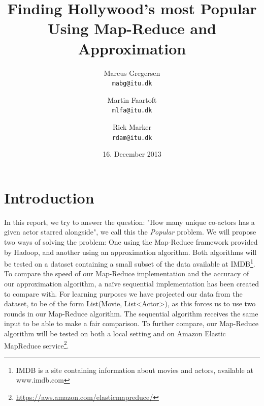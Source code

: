 \documentclass[a4paper,11pt]{article}
\begin{document}
\date{16. December 2013}
\title{Finding Hollywood's most Popular\\Using Map-Reduce and Approximation}

\author{Marcus Gregersen\\
\texttt{mabg@itu.dk} 
\and Martin Faartoft\\
\texttt{mlfa@itu.dk}
\and Rick Marker\\
\texttt{rdam@itu.dk}}
\clearpage\maketitle
\thispagestyle{empty}
\newpage
\setcounter{page}{1}
\section{Introduction}

In this report, we try to answer the question: "How many unique co-actors has a given actor starred alongside", we call this the \emph{Popular} problem. We will propose two ways of solving the problem: One using the Map-Reduce framework provided by Hadoop, and another using an approximation algorithm. Both algorithms will be tested on a dataset containing a small subset of the data available at IMDB\footnote{IMDB is a site containing information about movies and actors, available at www.imdb.com}.\\

To compare the speed of our Map-Reduce implementation and the accuracy of our approximation algorithm, a naïve sequential implementation has been created to compare with. For learning purposes we have projected our data from the dataset, to be of the form List(Movie, List<Actor>), as this forces us to use two rounds in our Map-Reduce algorithm. The sequential algorithm receives the same input to be able to make a fair comparison. To further compare, our Map-Reduce algorithm will be tested on both a local setting and on Amazon Elastic MapReduce service\footnote{\url{https://aws.amazon.com/elasticmapreduce/}}.
\end{document}
